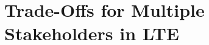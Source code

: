 \section{Trade-Offs for Multiple Stakeholders in LTE}\label{sec:application:lte_video}
\cite{Schwartz2013b}



